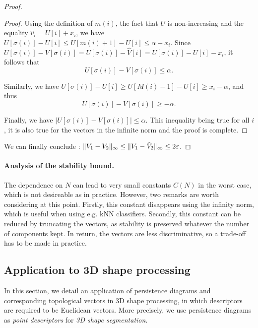 \begin{proof}
\begin{proof}
Using the definition of $m(i)$, the fact that $U$ is non-increasing and the equality $\hat v_i=U[i]+x_i$, we have 
$U[\sigma(i)]-U[i]\leq U[m(i)+1]-U[i]\leq\alpha+x_i$.
Since $U[\sigma(i)]-V[\sigma(i)]=U[\sigma(i)]-\hat V[i]=U[\sigma(i)]-U[i]-x_i$, it follows that
$$U[\sigma(i)]-V[\sigma(i)]\leq\alpha.$$

Similarly, we have $U[\sigma(i)]-U[i]\geq U[M(i)-1]-U[i]\geq x_i-\alpha$, and thus
$$U[\sigma(i)]-V[\sigma(i)]\geq-\alpha.$$

Finally, we have $|U[\sigma(i)]-V[\sigma(i)]|\leq\alpha.$
This inequality being true for all $i$, it is also true for the vectors in the infinite norm and the proof is complete.
\end{proof}

We can finally conclude : $\|V_1-V_2\|_\infty\leq \|V_1-\hat V_2\|_\infty\leq 2\varepsilon$.
\end{proof}


\paragraph*{Analysis of the stability bound.}
The dependence on $N$ can lead to very small constants $C(N)$ in the worst case, which is
not desireable as in practice.
However, two remarks are worth considering at this point.
Firstly, this constant disappears using the infinity norm, which is useful when using e.g. kNN classifiers.
Secondly, this constant can be reduced by truncating the vectors, as stability is preserved whatever the 
number of components kept. In return, the vectors are less discriminative, so a trade-off has to be made in practice.

\subsection{Application to 3D shape processing}
\label{sec:VectorExpe}

In this section, we detail an application of persistence diagrams and corresponding
 topological vectors  in 3D shape processing, 
in which descriptors are required to be Euclidean vectors.
More precisely, we use persistence diagrams as {\em point descriptors}
for {\em 3D shape segmentation}.  


